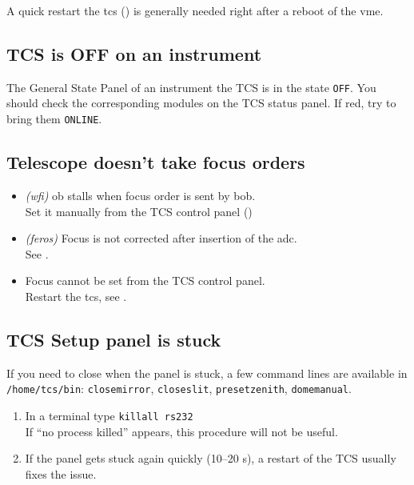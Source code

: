 \documentclass[11pt,fleqn,a4paper]{book}
\begin{document}
A quick restart the \gls{tcs} () is generally needed right after a reboot of the \gls{vme}.

\subsection{TCS is OFF on an instrument}
The \gls{General State} Panel of an instrument the TCS is in the state \texttt{OFF}. You should check the corresponding modules on the \gls{TCS status panel}.  If red, try to bring them \texttt{ONLINE}.

\subsection{Telescope doesn't take focus orders}

\begin{itemize}
  \item \textit{(\gls{wfi})} \gls{ob} \gls{stall}s when \gls{focus} order is sent by \gls{bob}.\\
        Set it manually from the \gls{TCS control panel} ()
  \item \textit{(\gls{feros})} Focus is not corrected after insertion of the \gls{adc}.\\
        See .
  \item Focus cannot be set from the \gls{TCS control panel}.\\
        Restart the \gls{tcs}, see .
\end{itemize}

\subsection{TCS Setup panel is stuck}

If you need to close when the panel is stuck, a few command lines are available in \texttt{/home/tcs/bin}: \texttt{closemirror}, \texttt{closeslit}, \texttt{presetzenith}, \texttt{domemanual}. 

\label{proc:unstuckTCSpanel}
\begin{enumerate}
  \item In a terminal type \texttt{killall rs232}\\
        If ``no process killed'' appears, this procedure will not be useful.
  \item If the panel gets stuck again quickly (10--20 s), a restart of the TCS usually fixes the issue. 
\end{enumerate}
\end{document}
